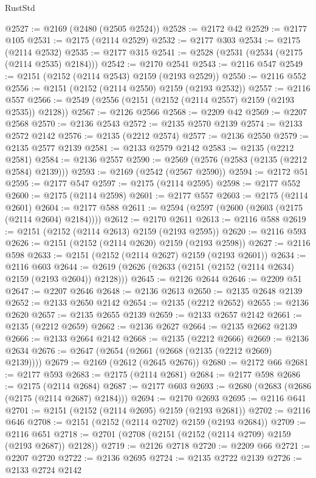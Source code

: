 \begin{lexlean}{RustStd}
\begin{coremodule}
@2527 := @2169 (@2480 (@2505 @2524))
@2528 := @2172 @42
@2529 := @2177 @105
@2531 := @2175 (@2114 @2529)
@2532 := @2177 @303
@2534 := @2175 (@2114 @2532)
@2535 := @2177 @315
@2541 := @2528 (@2531 (@2534 (@2175 (@2114 @2535) @2184)))
@2542 := @2170 @2541
@2543 := @2116 @547
@2549 := @2151 (@2152 (@2114 @2543) @2159 (@2193 @2529))
@2550 := @2116 @552
@2556 := @2151 (@2152 (@2114 @2550) @2159 (@2193 @2532))
@2557 := @2116 @557
@2566 := @2549 (@2556 (@2151 (@2152 (@2114 @2557) @2159 (@2193 @2535)) @2128))
@2567 := @2126 @2566
@2568 := @2209 @42
@2569 := @2207 @2568
@2570 := @2136 @2543
@2572 := @2135 @2570 @2139
@2574 := @2133 @2572 @2142
@2576 := @2135 (@2212 @2574)
@2577 := @2136 @2550
@2579 := @2135 @2577 @2139
@2581 := @2133 @2579 @2142
@2583 := @2135 (@2212 @2581)
@2584 := @2136 @2557
@2590 := @2569 (@2576 (@2583 (@2135 (@2212 @2584) @2139)))
@2593 := @2169 (@2542 (@2567 @2590))
@2594 := @2172 @51
@2595 := @2177 @547
@2597 := @2175 (@2114 @2595)
@2598 := @2177 @552
@2600 := @2175 (@2114 @2598)
@2601 := @2177 @557
@2603 := @2175 (@2114 @2601)
@2604 := @2177 @588
@2611 := @2594 (@2597 (@2600 (@2603 (@2175 (@2114 @2604) @2184))))
@2612 := @2170 @2611
@2613 := @2116 @588
@2619 := @2151 (@2152 (@2114 @2613) @2159 (@2193 @2595))
@2620 := @2116 @593
@2626 := @2151 (@2152 (@2114 @2620) @2159 (@2193 @2598))
@2627 := @2116 @598
@2633 := @2151 (@2152 (@2114 @2627) @2159 (@2193 @2601))
@2634 := @2116 @603
@2644 := @2619 (@2626 (@2633 (@2151 (@2152 (@2114 @2634) @2159 (@2193 @2604)) @2128)))
@2645 := @2126 @2644
@2646 := @2209 @51
@2647 := @2207 @2646
@2648 := @2136 @2613
@2650 := @2135 @2648 @2139
@2652 := @2133 @2650 @2142
@2654 := @2135 (@2212 @2652)
@2655 := @2136 @2620
@2657 := @2135 @2655 @2139
@2659 := @2133 @2657 @2142
@2661 := @2135 (@2212 @2659)
@2662 := @2136 @2627
@2664 := @2135 @2662 @2139
@2666 := @2133 @2664 @2142
@2668 := @2135 (@2212 @2666)
@2669 := @2136 @2634
@2676 := @2647 (@2654 (@2661 (@2668 (@2135 (@2212 @2669) @2139))))
@2679 := @2169 (@2612 (@2645 @2676))
@2680 := @2172 @66
@2681 := @2177 @593
@2683 := @2175 (@2114 @2681)
@2684 := @2177 @598
@2686 := @2175 (@2114 @2684)
@2687 := @2177 @603
@2693 := @2680 (@2683 (@2686 (@2175 (@2114 @2687) @2184)))
@2694 := @2170 @2693
@2695 := @2116 @641
@2701 := @2151 (@2152 (@2114 @2695) @2159 (@2193 @2681))
@2702 := @2116 @646
@2708 := @2151 (@2152 (@2114 @2702) @2159 (@2193 @2684))
@2709 := @2116 @651
@2718 := @2701 (@2708 (@2151 (@2152 (@2114 @2709) @2159 (@2193 @2687)) @2128))
@2719 := @2126 @2718
@2720 := @2209 @66
@2721 := @2207 @2720
@2722 := @2136 @2695
@2724 := @2135 @2722 @2139
@2726 := @2133 @2724 @2142

\end{coremodule}
\end{lexlean}
